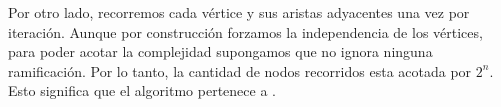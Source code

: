 
Por otro lado, recorremos cada vértice y sus aristas adyacentes una vez por iteración. Aunque por construcción forzamos la independencia de los vértices, para poder acotar la complejidad supongamos que no ignora ninguna ramificación. Por lo tanto, la cantidad de nodos recorridos esta acotada por $2^n$. Esto significa que el algoritmo pertenece a .